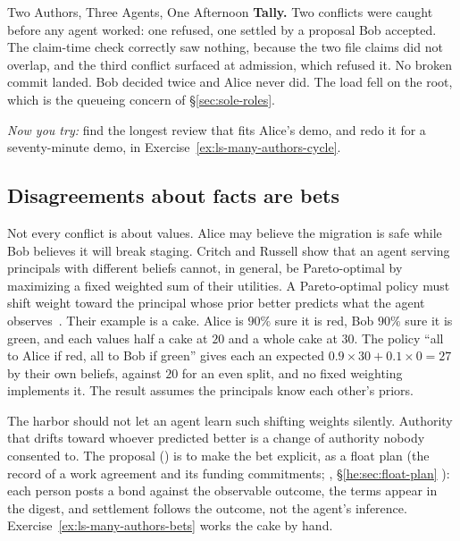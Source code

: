 \begin{pdexample}{Two Authors, Three Agents, One Afternoon}
\textbf{Tally.} Two conflicts were caught before any agent worked: one refused,
one settled by a proposal Bob accepted. The claim-time check correctly saw
nothing, because the two file claims did not overlap, and the third conflict
surfaced at admission, which refused it. No broken commit landed. Bob decided twice and Alice never did. The load fell on the root,
which is the queueing concern of \S\ref{sec:sole-roles}.

\emph{Now you try:} find the longest review that fits Alice's demo, and redo it
for a seventy-minute demo, in Exercise~\ref{ex:ls-many-authors-cycle}.
\end{pdexample}

\subsection{Disagreements about facts are bets}\label{sec:ls-many-authors-bets}

Not every conflict is about values. Alice may believe the migration is safe
while Bob believes it will break staging. Critch and Russell show that an
agent serving principals with different beliefs cannot, in general, be
Pareto-optimal by maximizing a fixed weighted sum of their utilities. A
Pareto-optimal policy must shift weight toward the principal whose prior better
predicts what the agent observes~. Their example is a
cake. Alice is $90\%$ sure it is red, Bob $90\%$ sure it is green, and each
values half a cake at $20$ and a whole cake at $30$. The policy ``all to Alice
if red, all to Bob if green'' gives each an expected $0.9\times30+0.1\times0
=27$ by their own beliefs, against $20$ for an even split, and no fixed
weighting implements it. The result assumes the principals know each other's
priors.

The harbor should not let an agent learn such shifting weights silently.
Authority that drifts toward whoever predicted better is a change of authority
nobody consented to. The proposal (\Vision) is to make the bet explicit, as a
float plan (the record of a work agreement and its funding commitments;
%
\ifpdbook
, \S\ref{he:sec:float-plan}%
\fi
): each person posts a bond against the observable outcome, the terms appear in
the digest, and settlement follows the outcome, not the agent's inference.
Exercise~\ref{ex:ls-many-authors-bets} works the cake by hand.

